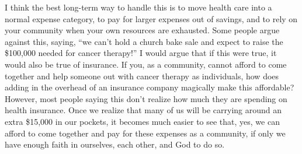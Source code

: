 I think the best long-term way to handle this is to move health care
into a normal expense category, to pay for larger expenses out of
savings, and to rely on your community when your own resources are
exhausted.  Some people argue against this, saying, “we
can't hold a church bake sale and expect to raise the
\$100,000 needed for cancer therapy!”  I would argue that if this were
true, it would also be true of insurance.  If you, as a community,
cannot afford to come together and help someone out with cancer therapy
as individuals, how does adding in the overhead of an insurance company
magically make this affordable?  However, most people saying this
don't realize how much they are spending on health
insurance.  Once we realize that many of us will be carrying around an
extra \$15,000 in our pockets, it becomes much easier to see that, yes,
we can afford to come together and pay for these expenses as a
community, if only we have enough faith in ourselves, each other, and
God to do so.

